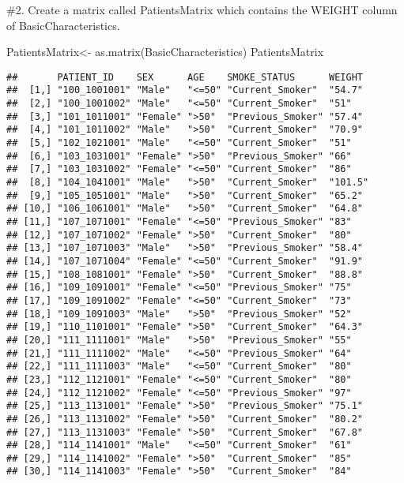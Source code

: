 \documentclass[
]{article}
\newenvironment{Shaded}{\begin{snugshade}}{\end{snugshade}}
\newcommand{\FunctionTok}[1]{\textcolor[rgb]{0.00,0.00,0.00}{#1}}
\newcommand{\NormalTok}[1]{#1}
\newcommand{\OtherTok}[1]{\textcolor[rgb]{0.56,0.35,0.01}{#1}}
\begin{document}
\#2. Create a matrix called PatientsMatrix which contains the WEIGHT
column of BasicCharacteristics.

\begin{Shaded}
\begin{Highlighting}[]
\NormalTok{PatientsMatrix}\OtherTok{\textless{}{-}} \FunctionTok{as.matrix}\NormalTok{(BasicCharacteristics)}
\NormalTok{PatientsMatrix}
\end{Highlighting}
\end{Shaded}

\begin{verbatim}
##       PATIENT_ID    SEX      AGE    SMOKE_STATUS      WEIGHT 
##  [1,] "100_1001001" "Male"   "<=50" "Current_Smoker"  "54.7" 
##  [2,] "100_1001002" "Male"   "<=50" "Current_Smoker"  "51"   
##  [3,] "101_1011001" "Female" ">50"  "Previous_Smoker" "57.4" 
##  [4,] "101_1011002" "Male"   ">50"  "Current_Smoker"  "70.9" 
##  [5,] "102_1021001" "Male"   "<=50" "Current_Smoker"  "51"   
##  [6,] "103_1031001" "Female" ">50"  "Previous_Smoker" "66"   
##  [7,] "103_1031002" "Female" "<=50" "Current_Smoker"  "86"   
##  [8,] "104_1041001" "Male"   ">50"  "Current_Smoker"  "101.5"
##  [9,] "105_1051001" "Male"   ">50"  "Current_Smoker"  "65.2" 
## [10,] "106_1061001" "Male"   ">50"  "Current_Smoker"  "64.8" 
## [11,] "107_1071001" "Female" "<=50" "Previous_Smoker" "83"   
## [12,] "107_1071002" "Female" ">50"  "Current_Smoker"  "80"   
## [13,] "107_1071003" "Male"   ">50"  "Previous_Smoker" "58.4" 
## [14,] "107_1071004" "Female" "<=50" "Current_Smoker"  "91.9" 
## [15,] "108_1081001" "Female" ">50"  "Current_Smoker"  "88.8" 
## [16,] "109_1091001" "Female" "<=50" "Previous_Smoker" "75"   
## [17,] "109_1091002" "Female" "<=50" "Current_Smoker"  "73"   
## [18,] "109_1091003" "Male"   ">50"  "Previous_Smoker" "52"   
## [19,] "110_1101001" "Female" ">50"  "Current_Smoker"  "64.3" 
## [20,] "111_1111001" "Male"   ">50"  "Previous_Smoker" "55"   
## [21,] "111_1111002" "Male"   "<=50" "Previous_Smoker" "64"   
## [22,] "111_1111003" "Male"   "<=50" "Current_Smoker"  "80"   
## [23,] "112_1121001" "Female" "<=50" "Current_Smoker"  "80"   
## [24,] "112_1121002" "Female" "<=50" "Previous_Smoker" "97"   
## [25,] "113_1131001" "Female" ">50"  "Previous_Smoker" "75.1" 
## [26,] "113_1131002" "Female" ">50"  "Current_Smoker"  "80.2" 
## [27,] "113_1131003" "Female" ">50"  "Current_Smoker"  "67.8" 
## [28,] "114_1141001" "Male"   "<=50" "Current_Smoker"  "61"   
## [29,] "114_1141002" "Female" ">50"  "Current_Smoker"  "85"   
## [30,] "114_1141003" "Female" ">50"  "Current_Smoker"  "84"   

\end{verbatim}
\end{document}
